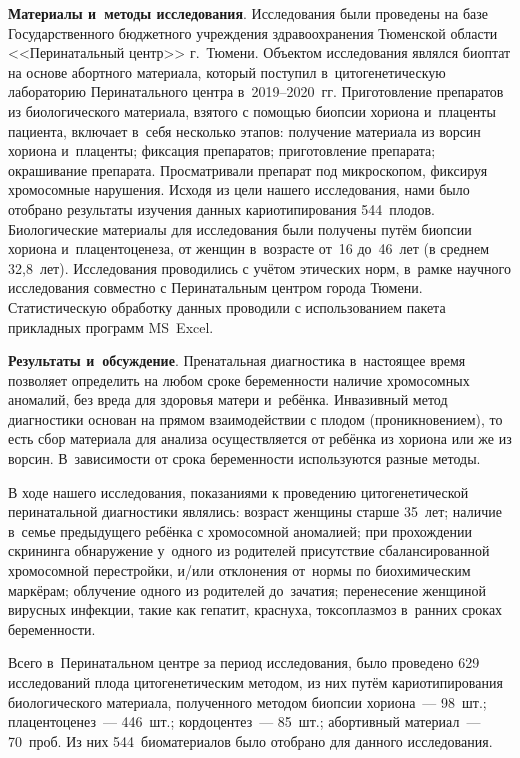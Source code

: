 \textbf{Материалы и~методы исследования}. Исследования были проведены на базе Государственного бюджетного учреждения здравоохранения Тюменской области <<Перинатальный центр>> г.~Тюмени. Объектом исследования являлся биоптат на основе абортного материала, который поступил в~цитогенетическую лабораторию Перинатального центра в~2019--2020~гг. Приготовление препаратов из биологического материала, взятого с помощью биопсии хориона и~плаценты пациента, включает в~себя несколько этапов: получение материала из ворсин хориона и~плаценты; фиксация препаратов; приготовление препарата; окрашивание препарата. Просматривали препарат под микроскопом, фиксируя хромосомные нарушения. Исходя из цели нашего исследования, нами было отобрано результаты изучения данных кариотипирования 544~плодов. Биологические материалы для исследования были получены путём биопсии хориона и~плацентоценеза, от женщин в~возрасте от~16 до~46~лет (в среднем 32,8~лет).  Исследования проводились с учётом этических норм, в~рамке научного исследования совместно с Перинатальным центром города Тюмени. Статистическую обработку данных проводили с использованием пакета прикладных программ MS~Excel.

\textbf{Результаты и~обсуждение}. Пренатальная диагностика в~настоящее время позволяет определить на любом сроке беременности наличие хромосомных аномалий, без вреда для здоровья матери и~ребёнка. Инвазивный метод диагностики основан на прямом взаимодействии с плодом (проникновением), то есть сбор материала для анализа осуществляется от ребёнка из хориона или же из ворсин. В~зависимости от срока беременности используются разные методы.

В ходе нашего исследования, показаниями к проведению цитогенетической перинатальной диагностики являлись: возраст женщины старше 35~лет; наличие в~семье предыдущего ребёнка с хромосомной аномалией; при прохождении скрининга обнаружение у~одного из родителей присутствие сбалансированной хромосомной перестройки, и/или отклонения от~нормы по биохимическим маркёрам; облучение одного из родителей до~зачатия; перенесение женщиной вирусных инфекции, такие как гепатит, краснуха, токсоплазмоз в~ранних сроках беременности.

Всего в~Перинатальном центре за период исследования, было проведено 629 исследований плода цитогенетическим методом, из них путём кариотипирования биологического материала, полученного методом биопсии хориона~--- 98~шт.; плацентоценез~--- 446~шт.; кордоцентез~--- 85~шт.; абортивный материал~--- 70~проб. Из них 544~биоматериалов было отобрано для данного исследования.

